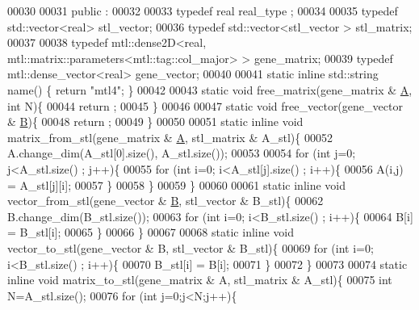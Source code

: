 \begin{DoxyCode}
00030 
00031 public :
00032 
00033   \textcolor{keyword}{typedef} real real\_type ;
00034 
00035   \textcolor{keyword}{typedef} std::vector<real>  stl\_vector;
00036   \textcolor{keyword}{typedef} std::vector<stl\_vector > stl\_matrix;
00037 
00038   \textcolor{keyword}{typedef} mtl::dense2D<real, mtl::matrix::parameters<mtl::tag::col\_major> > gene\_matrix;
00039   \textcolor{keyword}{typedef} mtl::dense\_vector<real>  gene\_vector;
00040 
00041   \textcolor{keyword}{static} \textcolor{keyword}{inline} std::string name() \{ \textcolor{keywordflow}{return} \textcolor{stringliteral}{"mtl4"}; \}
00042 
00043   \textcolor{keyword}{static} \textcolor{keywordtype}{void} free\_matrix(gene\_matrix & \hyperlink{group___core___module_class_eigen_1_1_matrix}{A}, \textcolor{keywordtype}{int} N)\{
00044     return ;
00045   \}
00046 
00047   \textcolor{keyword}{static} \textcolor{keywordtype}{void} free\_vector(gene\_vector & \hyperlink{group___core___module_class_eigen_1_1_matrix}{B})\{
00048     return ;
00049   \}
00050 
00051   \textcolor{keyword}{static} \textcolor{keyword}{inline} \textcolor{keywordtype}{void} matrix\_from\_stl(gene\_matrix & \hyperlink{group___core___module_class_eigen_1_1_matrix}{A}, stl\_matrix & A\_stl)\{
00052     A.change\_dim(A\_stl[0].size(), A\_stl.size());
00053 
00054     \textcolor{keywordflow}{for} (\textcolor{keywordtype}{int} j=0; j<A\_stl.size() ; j++)\{
00055       \textcolor{keywordflow}{for} (\textcolor{keywordtype}{int} i=0; i<A\_stl[j].size() ; i++)\{
00056         A(i,j) = A\_stl[j][i];
00057       \}
00058     \}
00059   \}
00060 
00061   \textcolor{keyword}{static} \textcolor{keyword}{inline} \textcolor{keywordtype}{void} vector\_from\_stl(gene\_vector & \hyperlink{group___core___module_class_eigen_1_1_matrix}{B}, stl\_vector & B\_stl)\{
00062     B.change\_dim(B\_stl.size());
00063     \textcolor{keywordflow}{for} (\textcolor{keywordtype}{int} i=0; i<B\_stl.size() ; i++)\{
00064       B[i] = B\_stl[i];
00065     \}
00066   \}
00067 
00068   \textcolor{keyword}{static} \textcolor{keyword}{inline} \textcolor{keywordtype}{void} vector\_to\_stl(gene\_vector & B, stl\_vector & B\_stl)\{
00069     \textcolor{keywordflow}{for} (\textcolor{keywordtype}{int} i=0; i<B\_stl.size() ; i++)\{
00070       B\_stl[i] = B[i];
00071     \}
00072   \}
00073 
00074   \textcolor{keyword}{static} \textcolor{keyword}{inline} \textcolor{keywordtype}{void} matrix\_to\_stl(gene\_matrix & A, stl\_matrix & A\_stl)\{
00075     \textcolor{keywordtype}{int} N=A\_stl.size();
00076     \textcolor{keywordflow}{for} (\textcolor{keywordtype}{int} j=0;j<N;j++)\{

\end{DoxyCode}
